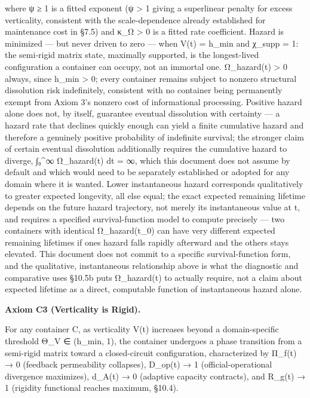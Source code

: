 \documentclass[
]{article}
\begin{document}
where ψ ≥ 1 is a fitted exponent (ψ \textgreater{} 1 giving a
superlinear penalty for excess verticality, consistent with the
scale-dependence already established for maintenance cost in §7.5) and
κ\_Ω \textgreater{} 0 is a fitted rate coefficient. Hazard is minimized
--- but never driven to zero --- when V(t) = h\_min and χ\_supp = 1: the
semi-rigid matrix state, maximally supported, is the longest-lived
configuration a container can occupy, not an immortal one. Ω\_hazard(t)
\textgreater{} 0 always, since h\_min \textgreater{} 0; every container
remains subject to nonzero structural dissolution risk indefinitely,
consistent with no container being permanently exempt from Axiom 3's
nonzero cost of informational processing. Positive hazard alone does
not, by itself, guarantee eventual dissolution with certainty --- a
hazard rate that declines quickly enough can yield a finite cumulative
hazard and therefore a genuinely positive probability of indefinite
survival; the stronger claim of certain eventual dissolution
additionally requires the cumulative hazard to diverge, ∫₀\^{}∞
Ω\_hazard(t) dt = ∞, which this document does not assume by default and
which would need to be separately established or adopted for any domain
where it is wanted. Lower instantaneous hazard corresponds qualitatively
to greater expected longevity, all else equal; the exact expected
remaining lifetime depends on the future hazard trajectory, not merely
its instantaneous value at t, and requires a specified survival-function
model to compute precisely --- two containers with identical
Ω\_hazard(t\_0) can have very different expected remaining lifetimes if
ones hazard falls rapidly afterward and the others stays elevated. This
document does not commit to a specific survival-function form, and the
qualitative, instantaneous relationship above is what the diagnostic and
comparative uses §10.5b puts Ω\_hazard(t) to actually require, not a
claim about expected lifetime as a direct, computable function of
instantaneous hazard alone.

\textbf{Axiom C3 (Verticality is Rigid).}

For any container C, as verticality V(t) increases beyond a
domain-specific threshold Θ\_V ∈ (h\_min, 1), the container undergoes a
phase transition from a semi-rigid matrix toward a closed-circuit
configuration, characterized by Π\_f(t) → 0 (feedback permeability
collapses), D\_op(t) → 1 (official-operational divergence maximizes),
d\_A(t) → 0 (adaptive capacity contracts), and R\_g(t) → 1 (rigidity
functional reaches maximum, §10.4).
\end{document}
